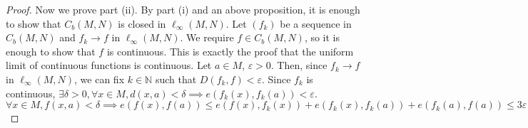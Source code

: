 \begin{proof}
	Now we prove part (ii).
	By part (i) and an above proposition, it is enough to show that \( C_b(M,N) \) is closed in \( \ell_\infty(M,N) \).
	Let \( (f_k) \) be a sequence in \( C_b(M,N) \) and \( f_k \to f \) in \( \ell_\infty(M,N) \).
	We require \( f \in C_b(M,N) \), so it is enough to show that \( f \) is continuous.
	This is exactly the proof that the uniform limit of continuous functions is continuous.
	Let \( a \in M \), \( \varepsilon > 0 \).
	Then, since \( f_k \to f \) in \( \ell_\infty(M,N) \), we can fix \( k \in \mathbb N \) such that \( D(f_k,f) < \varepsilon \).
	Since \( f_k \) is continuous, \( \exists \delta > 0, \forall x \in M, d(x,a) < \delta \implies e(f_k(x), f_k(a)) < \varepsilon \).
	\[
		\forall x \in M, f(x,a) < \delta \implies e(f(x),f(a)) \leq e(f(x), f_k(x)) + e(f_k(x), f_k(a)) + e(f_k(a), f(a)) \leq 3\varepsilon
	\]
\end{proof}
